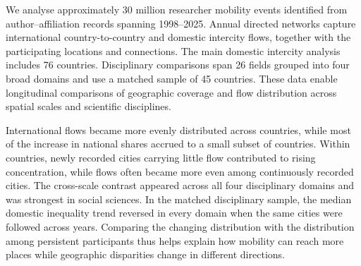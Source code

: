 We analyse approximately 30 million researcher mobility events identified from author--affiliation records spanning 1998--2025. Annual directed networks capture international country-to-country and domestic intercity flows, together with the participating locations and connections. The main domestic intercity analysis includes 76 countries. Disciplinary comparisons span 26 fields grouped into four broad domains and use a matched sample of 45 countries. These data enable longitudinal comparisons of geographic coverage and flow distribution across spatial scales and scientific disciplines.

International flows became more evenly distributed across countries, while most of the increase in national shares accrued to a small subset of countries. Within countries, newly recorded cities carrying little flow contributed to rising concentration, while flows often became more even among continuously recorded cities. The cross-scale contrast appeared across all four disciplinary domains and was strongest in social sciences. In the matched disciplinary sample, the median domestic inequality trend reversed in every domain when the same cities were followed across years. Comparing the changing distribution with the distribution among persistent participants thus helps explain how mobility can reach more places while geographic disparities change in different directions.

\FloatBarrier
